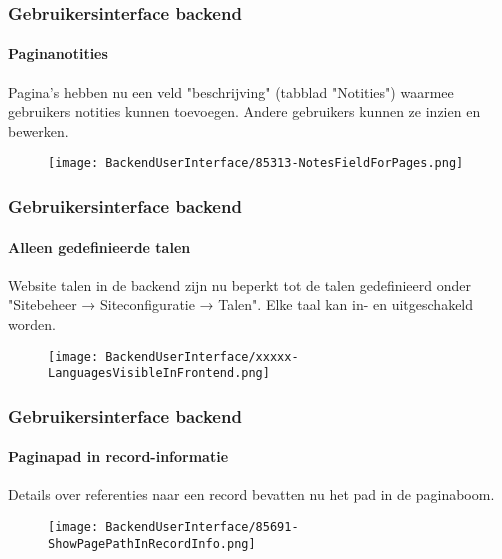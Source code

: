 
\begin{frame}[fragile]
	\frametitle{Gebruikersinterface backend}
	\framesubtitle{Paginanotities}

	Pagina's hebben nu een veld "beschrijving" (tabblad "Notities") waarmee
	gebruikers notities kunnen toevoegen. Andere gebruikers kunnen ze inzien
	en bewerken.

	\begin{figure}
		\texttt{[image: BackendUserInterface/85313-NotesFieldForPages.png]}
	\end{figure}

\end{frame}


\begin{frame}[fragile]
	\frametitle{Gebruikersinterface backend}
	\framesubtitle{Alleen gedefinieerde talen}

	Website talen in de backend zijn nu beperkt tot de talen gedefinieerd onder
	"Sitebeheer → Siteconfiguratie → Talen". Elke taal kan in- en uitgeschakeld
	worden.

	\begin{figure}
		\texttt{[image: BackendUserInterface/xxxxx-LanguagesVisibleInFrontend.png]}
	\end{figure}

\end{frame}


\begin{frame}[fragile]
	\frametitle{Gebruikersinterface backend}
	\framesubtitle{Paginapad in record-informatie}

	Details over referenties naar een record bevatten nu het pad in de paginaboom.

	\begin{figure}
		\texttt{[image: BackendUserInterface/85691-ShowPagePathInRecordInfo.png]}
	\end{figure}

\end{frame}

